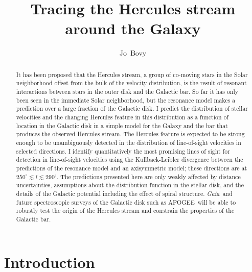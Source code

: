 \documentclass[12pt,preprint]{aastex}
\newcommand{\Gaia}{\emph{Gaia}}
\newcommand{\apogee}{APOGEE}
\begin{document}
\title{Tracing the Hercules stream around the Galaxy}
\author{Jo~Bovy}%

\begin{abstract}
It has been proposed that the Hercules stream, a group of co-moving
stars in the Solar neighborhood offset from the bulk of the velocity
distribution, is the result of resonant interactions between stars in
the outer disk and the Galactic bar. So far it has only been seen in
the immediate Solar neighborhood, but the resonance model makes a
prediction over a large fraction of the Galactic disk. I predict the
distribution of stellar velocities and the changing Hercules feature
in this distribution as a function of location in the Galactic disk in
a simple model for the Galaxy and the bar that produces the observed
Hercules stream. The Hercules feature is expected to be strong enough
to be unambiguously detected in the distribution of line-of-sight
velocities in selected directions. I identify quantitatively the most
promising lines of sight for detection in line-of-sight velocities
using the Kullback-Leibler divergence between the predictions of the
resonance model and an axisymmetric model; these directions are at
$250^{\circ} \lesssim l \lesssim 290^{\circ}$. The predictions
presented here are only weakly affected by distance uncertainties,
assumptions about the distribution function in the stellar disk, and
the details of the Galactic potential including the effect of spiral
structure. \Gaia\ and future spectroscopic surveys of the Galactic
disk such as \apogee\ will be able to robustly test the origin of the
Hercules stream and constrain the properties of the Galactic bar.
\end{abstract}


\section{Introduction}
\end{document}
